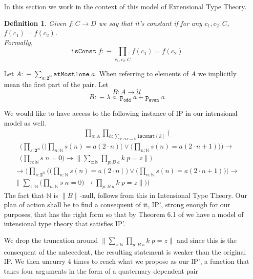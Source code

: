 \documentclass[12pt]{report}
\newtheorem{defn}[thm]{Definition}
\begin{document}
In this section we work in the context of this model of Extensional Type Theory.
\begin{defn}
Given $f : C \rightarrow D$ we say that it's constant if for any $c_1,c_2 : C$, $f(c_1) = f(c_2)$.\\
Formally,
$$\mathtt{isConst}\; f :\equiv \prod_{c_1,c_2 : C}f(c_1) = f(c_2)$$
\end{defn}
Let $A :\equiv \sum_{a: \mathbf{2}^\mathbb{N}}\mathtt{atMost1one}\;a$. 
When referring to elements of $A$ we implicitly mean the first part of the pair. 
Let
$$B : A \rightarrow \mathcal{U}$$
$$B :\equiv \lambda\; a.\; \mathtt{p_{odd}}\; a + \mathtt{p_{even}}\; a$$

We would like to have access to the following instance of IP in our intensional model as well.
\begin{multline*}
\prod_{a: A} \prod_{h : \sum_{k : B\;a \rightarrow \mathbb{N}}\mathtt{isConst}(k)} \Bigg( 
\end{multline*}
\begin{multline*}
\bigg( \prod_{s : \mathbf{2}^\mathbb{N}} \Big(\big(\prod_{n : \mathbb{N}} s(n) = a(2 \cdot n)\big) \vee \big(\prod_{n : \mathbb{N}} s(n) = a(2\cdot n +1)\big) \Big) \rightarrow \\
	 \Big(\prod_{n : \mathbb{N}}s\; n = 0 \Big) \rightarrow \Big\lVert \sum_{z : \mathbb{N}}\prod_{p: B\; a}  k\; p = z \Big\rVert \bigg)
\end{multline*}
\begin{multline*}
\rightarrow \bigg( \prod_{s : \mathbf{2}^\mathbb{N}} \Big(\big(\prod_{n : \mathbb{N}} s(n) = a(2 \cdot n)\big) \vee \big(\prod_{n : \mathbb{N}} s(n) = a(2\cdot n +1)\big) \Big) \rightarrow \\
	  \Big\lVert \sum_{z : \mathbb{N}} \Big(\prod_{n : \mathbb{N}}s\; n = 0 \Big) \rightarrow \prod_{p : B\; a} k\; p = z \Big\rVert \bigg) \Bigg)
\end{multline*}
The fact that $\mathbb{N}$ is $\lVert B \rVert$-null, follows from this in Intensional Type Theory. 
Our plan of action shall be to find a consequent of it, IP', strong enough for our purposes, that has the right form so that by Theorem 6.1 of \cite{1905.03014} we have a model of intensional type theory that satisfies IP'. 

We drop the truncation around $\lVert \sum_{z : \mathbb{N}} \prod_{p : B\; a} k\; p = z \rVert$ and since this is the consequent of the antecedent, the resulting statement is weaker than the original IP. We then uncurry 4 times to reach what we propose as our IP', a function that takes four arguments in the form of a quaternary dependent pair
\end{document}
